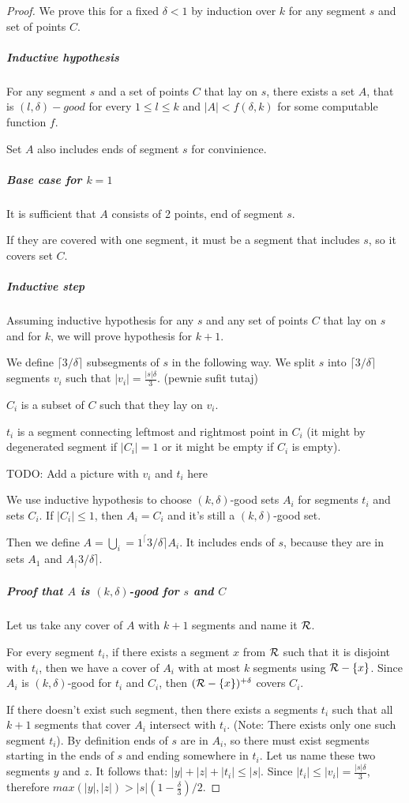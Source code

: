 \begin{proof}
We prove this for a fixed $\delta < 1$
by induction over $k$ for any segment $s$ and set of points $C$.

\subparagraph{Inductive hypothesis}
For any segment $s$ and a set of points $C$ that lay on $s$,
there exists a set $A$,
that is $(l, \delta)-good$ for every $1 \le l \le k$ and $|A| < f(\delta, k)$
for some computable function $f$.

Set $A$ also includes ends of segment $s$ for convinience.

\subparagraph{Base case for $k = 1$}
It is sufficient that $A$ consists of 2 points, end of segment $s$.

If they are covered with one segment, it must be a segment 
that includes $s$, so it covers set $C$.

\subparagraph{Inductive step}
Assuming inductive hypothesis for any $s$ and any set of points $C$
that lay on $s$ and for $k$, we will prove hypothesis for $k+1$.


We define $\lceil3/\delta\rceil$ subsegments of $s$ in the following way.
We split $s$ into $\lceil3/\delta\rceil$ segments $v_i$
such that $|v_i| = \frac{|s|\delta}{3}$. (pewnie sufit tutaj)

$C_i$ is a subset of $C$ such that they lay on $v_i$.

$t_i$ is a segment connecting leftmost and rightmost point in $C_i$
(it might by degenerated segment if $|C_i| = 1$ or it might be empty
if $C_i$ is empty).

TODO: Add a picture with $v_i$ and $t_i$ here

We use inductive hypothesis to choose $(k, \delta)$-good sets $A_i$
for segments $t_i$ and sets $C_i$. If $|C_i| \le 1$, then $A_i = C_i$
and it's still a $(k, \delta)$-good set.

Then we define $A = \bigcup_i=1^\lceil3/\delta\rceil A_i$.
It includes ends of $s$, because they are in sets $A_1$ and $A_\lceil3/\delta\rceil$.

\subparagraph{Proof that $A$ is $(k, \delta)$-good for $s$ and $C$}
Let us take any cover of $A$ with $k+1$ segments and name it $\mathcal{R}$.

For every segment $t_i$, if there exists a segment $x$ from $\mathcal{R}$ 
such that it is disjoint with $t_i$,
then we have a cover of $A_i$ with at most $k$
segments using $\mathcal{R} - \{x\}$.
Since $A_i$ is $(k, \delta)$-good for $t_i$ and $C_i$,
then $(\mathcal{R} - \{x\})^{+\delta}$ covers $C_i$.

If there doesn't exist such segment, then
there exists a segments $t_i$ such that all $k+1$ segments that cover
$A_i$ intersect with $t_i$. (Note: There exists only one such segment $t_i$).
By definition ends of $s$ are in $A_i$, so there must exist
segments starting in the ends of $s$ and ending somewhere in $t_i$.
Let us name these two segments $y$ and $z$. It follows that:
$|y| + |z| + |t_i| \le |s|$.
Since $|t_i| \le |v_i| = \frac{|s|\delta}{3}$,
therefore $max(|y|, |z|) > |s|(1-\frac{\delta}{3})/2$.



\end{proof}
